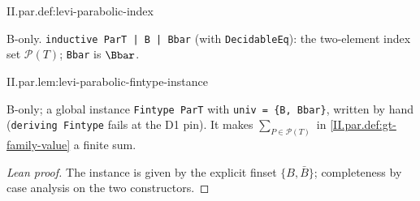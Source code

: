 \begin{definition}
\bonly
{}
\end{definition}
\begin{tfformal}{II.par.def:levi-parabolic-index}
\begin{tffidelity}
B-only. \texttt{inductive ParT | B | Bbar} (with \texttt{DecidableEq}): the two-element index set $\mathcal P(T)$; \texttt{Bbar} is $\Bbar$.
\end{tffidelity}
\end{tfformal}

\begin{lemma}
\bonly
{}
\end{lemma}
\begin{tfformal}{II.par.lem:levi-parabolic-fintype-instance}
\begin{tffidelity}
B-only; a global instance \texttt{Fintype ParT} with \texttt{univ = \{B, Bbar\}}, written by hand (\texttt{deriving Fintype} fails at the D1 pin). It makes $\sum_{P\in\mathcal P(T)}$ in \cref{II.par.def:gt-family-value} a finite sum.
\end{tffidelity}
\end{tfformal}
\begin{proof}[Lean proof]
The instance is given by the explicit finset $\{B,\bar B\}$; completeness by case analysis on the two constructors.
\end{proof}


